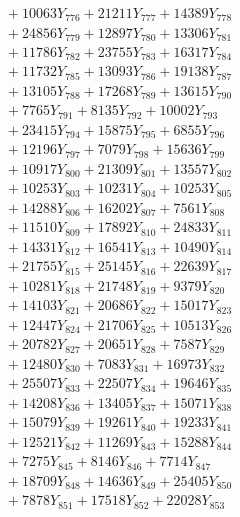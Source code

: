 \documentclass[a4paper,10pt]{article}
\begin{document}
{\begin{align}
&\;  + 10063 Y_{776} + 21211 Y_{777} + 14389 Y_{778} \\[0.5ex]\allowbreak
&\;  + 24856 Y_{779} + 12897 Y_{780} + 13306 Y_{781} \\[0.3ex]
&\;  + 11786 Y_{782} + 23755 Y_{783} + 16317 Y_{784} \\[0.3ex]
&\;  + 11732 Y_{785} + 13093 Y_{786} + 19138 Y_{787} \\[0.3ex]
&\;  + 13105 Y_{788} + 17268 Y_{789} + 13615 Y_{790} \\[0.3ex]
&\;  + 7765 Y_{791} + 8135 Y_{792} + 10002 Y_{793} \\[0.3ex]
&\;  + 23415 Y_{794} + 15875 Y_{795} + 6855 Y_{796} \\[0.3ex]
&\;  + 12196 Y_{797} + 7079 Y_{798} + 15636 Y_{799} \\[0.3ex]
&\;  + 10917 Y_{800} + 21309 Y_{801} + 13557 Y_{802} \\[0.3ex]
&\;  + 10253 Y_{803} + 10231 Y_{804} + 10253 Y_{805} \\[0.3ex]
&\;  + 14288 Y_{806} + 16202 Y_{807} + 7561 Y_{808} \\[0.5ex]\allowbreak
&\;  + 11510 Y_{809} + 17892 Y_{810} + 24833 Y_{811} \\[0.3ex]
&\;  + 14331 Y_{812} + 16541 Y_{813} + 10490 Y_{814} \\[0.3ex]
&\;  + 21755 Y_{815} + 25145 Y_{816} + 22639 Y_{817} \\[0.3ex]
&\;  + 10281 Y_{818} + 21748 Y_{819} + 9379 Y_{820} \\[0.3ex]
&\;  + 14103 Y_{821} + 20686 Y_{822} + 15017 Y_{823} \\[0.3ex]
&\;  + 12447 Y_{824} + 21706 Y_{825} + 10513 Y_{826} \\[0.3ex]
&\;  + 20782 Y_{827} + 20651 Y_{828} + 7587 Y_{829} \\[0.3ex]
&\;  + 12480 Y_{830} + 7083 Y_{831} + 16973 Y_{832} \\[0.3ex]
&\;  + 25507 Y_{833} + 22507 Y_{834} + 19646 Y_{835} \\[0.3ex]
&\;  + 14208 Y_{836} + 13405 Y_{837} + 15071 Y_{838} \\[0.5ex]\allowbreak
&\;  + 15079 Y_{839} + 19261 Y_{840} + 19233 Y_{841} \\[0.3ex]
&\;  + 12521 Y_{842} + 11269 Y_{843} + 15288 Y_{844} \\[0.3ex]
&\;  + 7275 Y_{845} + 8146 Y_{846} + 7714 Y_{847} \\[0.3ex]
&\;  + 18709 Y_{848} + 14636 Y_{849} + 25405 Y_{850} \\[0.3ex]
&\;  + 7878 Y_{851} + 17518 Y_{852} + 22028 Y_{853} \\[0.3ex]

\end{align}}
\end{document}
